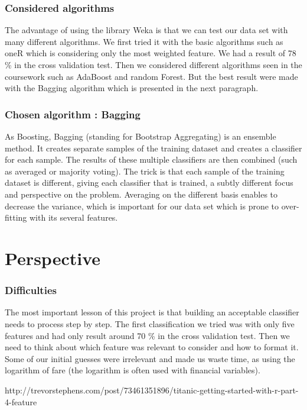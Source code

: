 \documentclass[11pt,a4paper,portrait]{article}
\begin{document}
\section{Considered algorithms}
The advantage of using the library Weka is that we can test our data set with many different algorithms. We first tried it with the basic algorithms such as oneR which is considering only the most weighted feature. We had a result of 78 \% in the cross validation test. Then we considered different algorithms seen in the coursework such as AdaBoost and random Forest. But the best result were made with the Bagging algorithm which is presented in the next paragraph.

\section{Chosen algorithm : Bagging}
As Boosting, Bagging (standing for Bootstrap Aggregating) is an ensemble method. It creates separate samples of the training dataset and creates a classifier for each sample. The results of these multiple classifiers are then combined (such as averaged or majority voting). The trick is that each sample of the training dataset is different, giving each classifier that is trained, a subtly different focus and perspective on the problem. Averaging on the different basis enables to decrease the variance, which is important for our data set which is prone to over-fitting with its several features.


\part{Perspective}
\setcounter{section}{0}

\section{Difficulties}
The most important lesson of this project is that building an acceptable classifier needs to process step by step. The first classification we tried was with only five features and had only result around 70 \% in the cross validation test. Then we need to think about which feature was relevant to consider and how to format it. Some of our initial guesses were irrelevant and made us waste time, as using the logarithm of fare (the logarithm is often used with financial variables).

http://trevorstephens.com/post/73461351896/titanic-getting-started-with-r-part-4-feature
\end{document}
